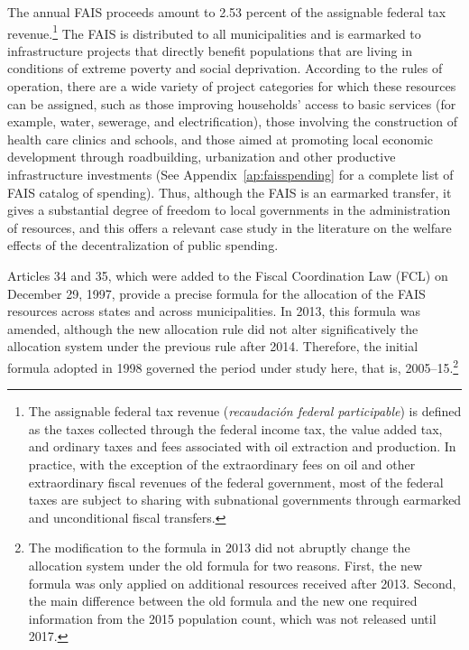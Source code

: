 \documentclass[dv_diss_main.tex]{subfiles}
\begin{document}
The annual FAIS proceeds amount to 2.53 percent of the assignable federal tax revenue.\footnote{The assignable federal tax revenue (\textit{recaudación federal participable}) is defined as the taxes collected through the federal income tax, the value added tax, and ordinary taxes and fees associated with oil extraction and production. In practice, with the exception of the extraordinary fees on oil and other extraordinary fiscal revenues of the federal government, most of the federal taxes are subject to sharing with subnational governments through earmarked and unconditional fiscal transfers.} The FAIS is distributed to all municipalities and is earmarked to infrastructure projects that directly benefit populations that are living in conditions of extreme poverty and social deprivation. According to the rules of operation, there are a wide variety of project categories for which these resources can be assigned, such as those improving households’ access to basic services (for example, water, sewerage, and electrification), those involving the construction of health care clinics and schools, and those aimed at promoting local economic development through roadbuilding, urbanization and other productive infrastructure investments (See Appendix~\ref{ap:faisspending}  for a complete list of FAIS catalog of spending). Thus, although the FAIS is an earmarked transfer, it gives a substantial degree of freedom to local governments in the administration of resources, and this offers a relevant case study in the literature on the welfare effects of the decentralization of public spending.

Articles 34 and 35, which were added to the Fiscal Coordination Law (FCL) on December 29, 1997, provide a precise formula for the allocation of the FAIS resources across states and across municipalities. In 2013, this formula was amended, although the new allocation rule did not alter significatively the allocation system under the previous rule after 2014. Therefore, the initial formula adopted in 1998 governed the period under study here, that is, 2005–15.\footnote{The modification to the formula in 2013 did not abruptly change the allocation system under the old formula for two reasons. First, the new formula was only applied on additional resources received after 2013. Second, the main difference between the old formula and the new one required information from the 2015 population count, which was not released until 2017.} 
\end{document}
